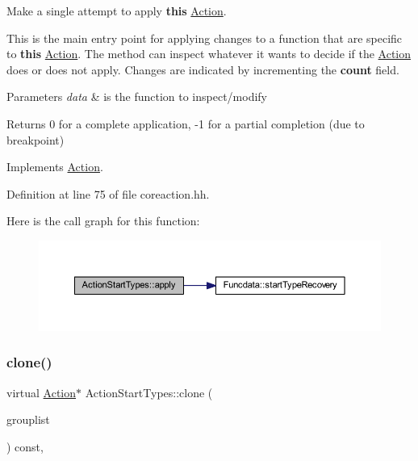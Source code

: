 Make a single attempt to apply {\bfseries{this}} \mbox{\hyperlink{class_action}{Action}}. 

This is the main entry point for applying changes to a function that are specific to {\bfseries{this}} \mbox{\hyperlink{class_action}{Action}}. The method can inspect whatever it wants to decide if the \mbox{\hyperlink{class_action}{Action}} does or does not apply. Changes are indicated by incrementing the {\bfseries{count}} field. 
\begin{DoxyParams}{Parameters}
{\em data} & is the function to inspect/modify \\
\hline
\end{DoxyParams}
\begin{DoxyReturn}{Returns}
0 for a complete application, -\/1 for a partial completion (due to breakpoint) 
\end{DoxyReturn}


Implements \mbox{\hyperlink{class_action_aac1c3999d6c685b15f5d9765a4d04173}{Action}}.



Definition at line 75 of file coreaction.\+hh.

Here is the call graph for this function\+:
\nopagebreak
\begin{figure}[H]
\begin{center}
\leavevmode
\includegraphics[width=350pt]{class_action_start_types_a14215a512844751f3199f318f60add40_cgraph}
\end{center}
\end{figure}
\mbox{\label{class_action_start_types_a6779f5bf6578c6318c2a9cc5d7648d0f}} 
\subsubsection{\texorpdfstring{clone()}{clone()}}
{\footnotesize\ttfamily virtual \mbox{\hyperlink{class_action}{Action}}$\ast$ Action\+Start\+Types\+::clone (\begin{DoxyParamCaption}\item[{const \mbox{\hyperlink{class_action_group_list}{Action\+Group\+List}} \&}]{grouplist }\end{DoxyParamCaption}) const\hspace{0.3cm}{\ttfamily [inline]}, {\ttfamily [virtual]}}




